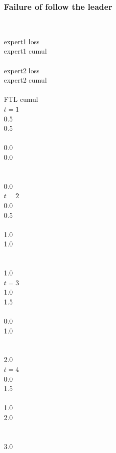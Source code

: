 \documentclass{beamer}
\begin{document}
\begin{frame}
\frametitle{Failure of follow the leader}
\begin{columns} 
\column[t]{2.5cm}
~ \\ expert1 loss\\ expert1 cumul\\~\\ expert2 loss\\ expert2 cumul  ~\\
~\\ FTL cumul\\

\column[t]{1cm}
 $t=1$   \\ 0.5\\ 0.5 \\~\\ 0.0  \\ 0.0 \\~\\~\\0.0\\
 		   			   
\column[t]{1cm}	   		   
 $t=2$   \\ 0.0 \\ 0.5 \\~\\ 1.0  \\ 1.0 \\~\\~\\1.0\\

\column[t]{1cm}
 $t=3$ \\ 1.0 \\ 1.5 \\~\\ 0.0 \\ 1.0 \\~\\~\\2.0\\
		    			     
\column[t]{1cm}	   		   
 $t=4$   \\ 0.0 \\ 1.5 \\~\\ 1.0  \\ 2.0 \\~\\~\\3.0\\


\end{columns}
\end{frame}
\end{document}
